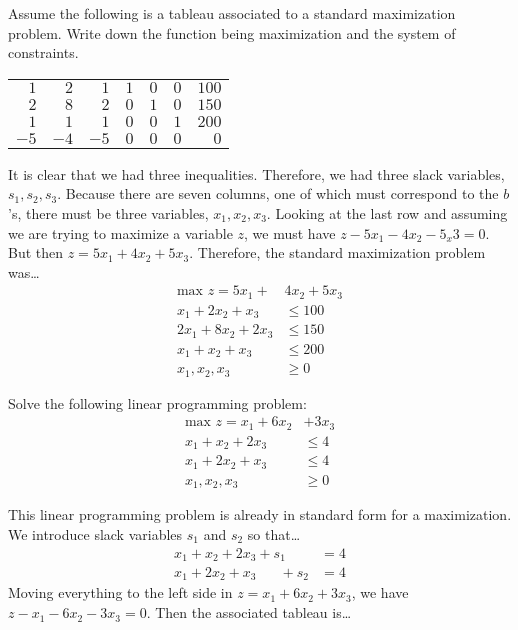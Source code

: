 \documentclass[11pt,letterpaper]{article}
\begin{document}
\newpage



 Assume the following is a tableau associated to a standard maximization problem. Write down the function being maximization and the system of constraints. 
	\begin{table}[!ht]
	\centering
	\begin{tabular}{rrrrrr|r}
	$1$ & $2$ & $1$ & $1$ & $0$ & $0$ & $100$ \\
	$2$ & $8$ & $2$ & $0$ & $1$ & $0$ & $150$ \\
	$1$ & $1$ & $1$ & $0$ & $0$ & $1$ & $200$ \\ \hline
	$-5$ & $-4$ & $-5$ & $0$ & $0$ & $0$ & $0$
	\end{tabular}
	\end{table} \pspace

\sol It is clear that we had three inequalities. Therefore, we had three slack variables, $s_1, s_2, s_3$. Because there are seven columns, one of which must correspond to the $b$'s, there must be three variables, $x_1, x_2, x_3$. Looking at the last row and assuming we are trying to maximize a variable $z$, we must have $z - 5x_1 - 4x_2 - 5_x3= 0$. But then $z= 5x_1 + 4x_2 + 5x_3$. Therefore, the standard maximization problem was\dots
	\[
	\begin{aligned}
	\text{max }  z= 5x_1 + &4x_2 + 5x_3 \\
	x_1 + 2x_2 + x_3&\leq 100 \\
	2x_1 + 8x_2 + 2x_3&\leq 150 \\
	x_1 + x_2 + x_3&\leq 200 \\
	x_1, x_2, x_3&\geq 0
	\end{aligned}
	\] 



\newpage



 Solve the following linear programming problem:
	\[
	\begin{aligned}
	\text{max } z= x_1 + 6x_2& + 3x_3 \\
	x_1 + x_2 + 2x_3&\leq 4 \\
	x_1 + 2x_2 + x_3&\leq 4 \\
	x_1, x_2, x_3&\geq 0 
	\end{aligned}
	\] \pspace

\sol This linear programming problem is already in standard form for a maximization. We introduce slack variables $s_1$ and $s_2$ so that\dots
	\[
	\begin{aligned}	
	x_1 + x_2 + 2x_3 + s_1 \phantom{+ s_2}&= 4 \\
	x_1 + 2x_2 + x_3 \phantom{+ s_1} + s_2 &= 4 
	\end{aligned}
	\] 
Moving everything to the left side in $z= x_1 + 6x_2 + 3x_3$, we have $z - x_1 - 6x_2 - 3x_3= 0$. Then the associated tableau is\dots
\end{document}
